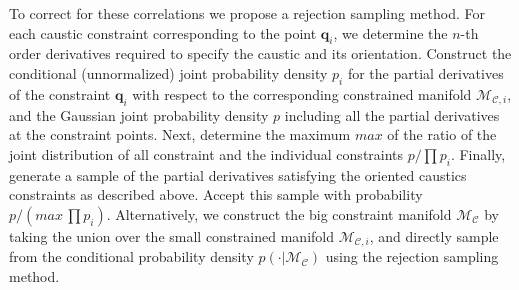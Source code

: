 \documentclass[a4paper, 11pt]{article}
\begin{document}
To correct for these correlations we propose a rejection sampling method. For each caustic constraint corresponding to the point $\bm{q}_i$, we determine the $n$-th order derivatives required to specify the caustic and its orientation. Construct the conditional (unnormalized) joint probability density $p_i$ for the partial derivatives of the constraint $\bm{q}_i$ with respect to the corresponding constrained manifold $\mathcal{M}_{\mathcal{C},i}$, and the Gaussian joint probability density $p$ including all the partial derivatives at the constraint points. Next, determine the maximum $max$ of the ratio of the joint distribution of all constraint and the individual constraints $p/\prod p_i$. Finally, generate a sample of the partial derivatives satisfying the oriented caustics constraints as described above. Accept this sample with probability $p/(max\, \prod p_i)$. Alternatively, we construct the big constraint manifold $\mathcal{M}_\mathcal{C}$ by taking the union over the small constrained manifold $\mathcal{M}_{\mathcal{C},i}$, and directly sample from the conditional probability density $p(\cdot |\mathcal{M}_\mathcal{C})$ using the rejection sampling method.
\end{document}
